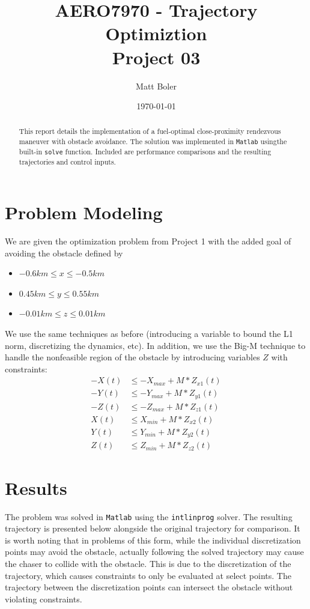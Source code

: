 \documentclass{article}
\title{AERO7970 - Trajectory Optimiztion \\ {\small Project 03}}
\author{Matt Boler}
\date{\today}
\begin{document}
\maketitle

\begin{abstract}
  This report details the implementation of a fuel-optimal close-proximity rendezvous maneuver with obstacle avoidance.
  The solution was implemented in \texttt{Matlab} usingthe built-in \texttt{solve} function.
  Included are performance comparisons and the resulting trajectories and control inputs.
\end{abstract}

\section{Problem Modeling}

We are given the optimization problem from Project 1 with the added goal of avoiding the obstacle defined by
\begin{itemize}
  \item $-0.6km \leq x \leq -0.5km$
  \item $0.45km \leq y \leq 0.55km$
  \item $-0.01km \leq z \leq 0.01km$
\end{itemize}

We use the same techniques as before (introducing a variable to bound the L1 norm, discretizing the dynamics, etc).
In addition, we use the Big-M technique to handle the nonfeasible region of the obstacle by introducing variables $Z$ with constraints:
\begin{align*}
  -X(t) &\leq -X_{max} + M * Z_{x1}(t) \\
  -Y(t) &\leq -Y_{max} + M * Z_{y1}(t) \\
  -Z(t) &\leq -Z_{max} + M * Z_{z1}(t) \\
  X(t) &\leq X_{min} + M * Z_{x2}(t) \\
  Y(t) &\leq Y_{min} + M * Z_{y2}(t) \\
  Z(t) &\leq Z_{min} + M * Z_{z2}(t)
\end{align*}


\section{Results}

The problem was solved in \texttt{Matlab} using the \texttt{intlinprog} solver.
The resulting trajectory is presented below alongside the original trajectory for comparison.
It is worth noting that in problems of this form, while the individual discretization points may avoid the obstacle, actually following the solved trajectory may cause the chaser to collide with the obstacle.
This is due to the discretization of the trajectory, which causes constraints to only be evaluated at select points.
The trajectory between the discretization points can intersect the obstacle without violating constraints.
\end{document}
